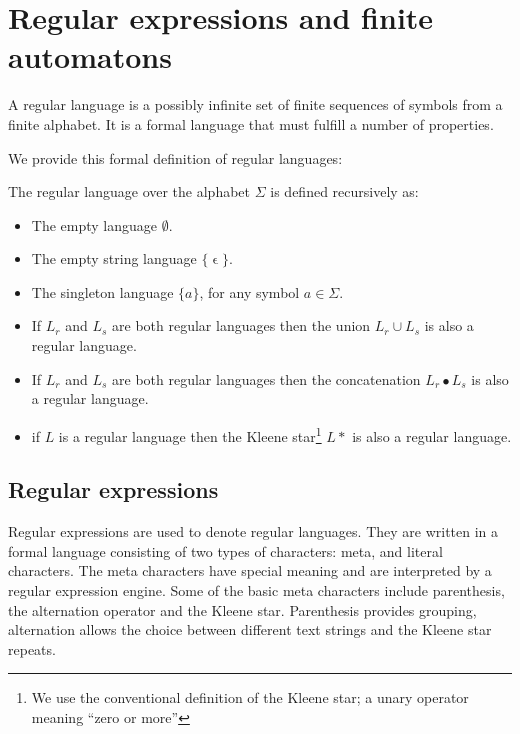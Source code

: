 \section{Regular expressions and finite automatons}
\label{sec:regular_finite}

A regular language is a possibly infinite set of finite sequences of
symbols from a finite alphabet. It is a formal language that must
fulfill a number of properties.


We provide this formal definition of regular languages:
\begin{definition}
  The regular language over the alphabet $\Sigma$ is defined
  recursively as:
  \begin{itemize}
  \item The empty language $\emptyset$.
  \item The empty string language $\{\upvarepsilon\}$.
  \item The singleton language $\{a\}$, for any symbol $a\in \Sigma$.
  \item If $L_r$ and $L_s$ are both regular languages then the union
    $L_r \cup L_s$ is also a regular language.
  \item If $L_r$ and $L_s$ are both regular languages then the
    concatenation $L_r \bullet L_s$ is also a regular language.
  \item if $L$ is a regular language then the Kleene star\footnote{We use the conventional definition of the Kleene star; a unary operator meaning ``zero or more'' } $L*$ is also
    a regular language.
  \end{itemize}
\end{definition}



\subsection{Regular expressions}

Regular expressions are used to denote regular languages. They are
written in a formal language consisting of two types of characters:
meta, and literal characters. The meta characters have
special meaning and are interpreted by a regular expression
engine. Some of the basic meta characters include parenthesis, the alternation
operator and the Kleene star. Parenthesis provides grouping,
alternation allows the choice between different text strings and the
Kleene star repeats. 

